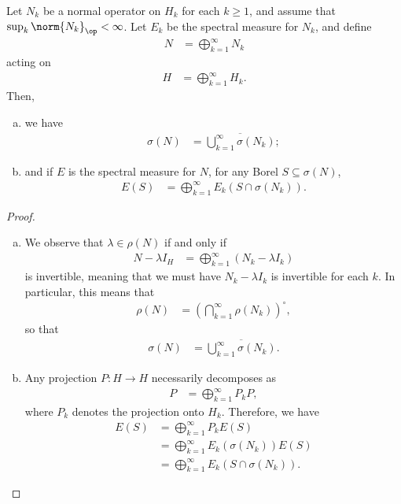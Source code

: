 \documentclass[10pt]{mypackage}
\begin{document}
\begin{proposition}
  Let $N_k$ be a normal operator on $H_k$ for each $k\geq 1$, and assume that $\sup_{k} \norm{N_k}_{\op} < \infty$. Let $E_k$ be the spectral measure for $N_k$, and define
  \begin{align*}
    N &= \bigoplus_{k=1}^{\infty}N_k
  \end{align*}
  acting on
  \begin{align*}
    H &= \bigoplus_{k=1}^{\infty} H_k.
  \end{align*}
  Then,
  \begin{enumerate}[(a)]
    \item we have
      \begin{align*}
        \sigma(N) &= \overline{\bigcup_{k=1}^{\infty}\sigma\left( N_k \right)};
      \end{align*}
    \item and if $E$ is the spectral measure for $N$, for any Borel $S\subseteq \sigma(N)$,
      \begin{align*}
        E(S) &= \bigoplus_{k=1}^{\infty} E_k\left( S\cap \sigma\left( N_k \right) \right).
      \end{align*}
  \end{enumerate}
\end{proposition}
\begin{proof}\hfill
  \begin{enumerate}[(a)]
    \item We observe that $\lambda\in \rho\left( N \right)$ if and only if
      \begin{align*}
        N-\lambda I_{H} &= \bigoplus_{k=1}^{\infty} \left( N_k - \lambda I_k \right)
      \end{align*}
      is invertible, meaning that we must have $N_k - \lambda I_k$ is invertible for each $k$. In particular, this means that
      \begin{align*}
        \rho(N) &= \left( \bigcap_{k=1}^{\infty} \rho\left( N_k \right) \right)^{\circ},
      \end{align*}
      so that
      \begin{align*}
        \sigma(N) &= \overline{\bigcup_{k=1}^{\infty} \sigma\left( N_k \right)}.
      \end{align*}
    \item Any projection $P\colon H\rightarrow H$ necessarily decomposes as
      \begin{align*}
        P &= \bigoplus_{k=1}^{\infty} P_k P,
      \end{align*}
      where $P_k$ denotes the projection onto $H_k$. Therefore, we have
      \begin{align*}
        E(S) &= \bigoplus_{k=1}^{\infty}P_k E(S)\\
             &= \bigoplus_{k=1}^{\infty} E_k\left(\sigma\left(N_k\right)\right)E(S)\\
             &= \bigoplus_{k=1}^{\infty} E_k\left( S\cap \sigma\left( N_k \right) \right).
      \end{align*}
  \end{enumerate}
\end{proof}
\end{document}
